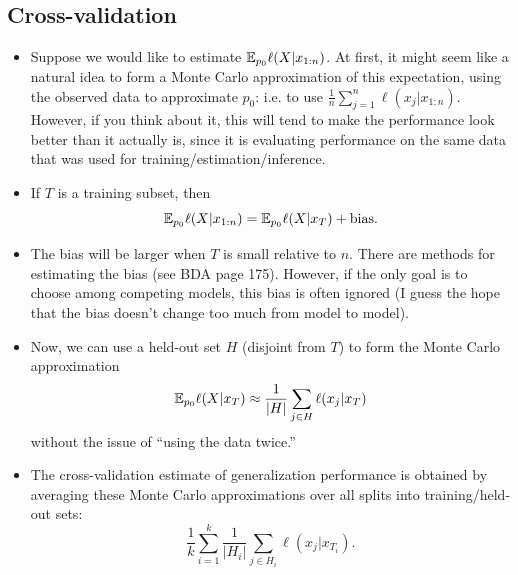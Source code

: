 \documentclass[12pt]{article}
\begin{document}
\subsection*{Cross-validation}
\begin{itemize}
\item Suppose we would like to estimate $\mathbb{E}_{p_0} \ell(X | x_{1:n})$. At first, it might seem like a natural idea to form a Monte Carlo approximation of this expectation, using the observed data to approximate $p_0$: i.e. to use $\frac{1}{n} \sum_{j = 1}^n \ell(x_j | x_{1:n})$. However, if you think about it, this will tend to make the performance look better than it actually is, since it is evaluating performance on the same data that was used for training/estimation/inference.
\item If $T$ is a training subset, then
 $$ \mathbb{E}_{p_0} \ell(X | x_{1:n}) = \mathbb{E}_{p_0} \ell(X | x_T) + \text{bias}. $$
\item The bias will be larger when $T$ is small relative to $n$. There are methods for estimating the bias (see BDA page 175). However, if the only goal is to choose among competing models, this bias is often ignored (I guess the hope that the bias doesn't change too much from model to model).
\item Now, we can use a held-out set $H$ (disjoint from $T$) to form the Monte Carlo approximation
 $$\mathbb{E}_{p_0} \ell(X | x_T) \approx \frac{1}{| H |}\sum_{j \in H} \ell(x_j | x_T)$$
 without the issue of ``using the data twice.''
\item The cross-validation estimate of generalization performance is obtained by averaging these Monte Carlo approximations over all splits into training/held-out sets:
 $$\frac{1}{k} \sum_{i = 1}^k \frac{1}{| H_i |}\sum_{j \in H_i} \ell(x_j | x_{T_i}).$$
\end{itemize}
\end{document}
